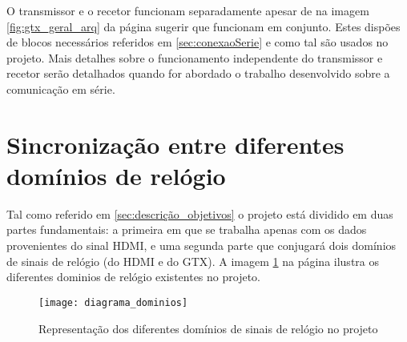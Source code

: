 O transmissor e o recetor funcionam separadamente apesar de na imagem \ref{fig:gtx_geral_arq} da página \pageref{fig:gtx_geral_arq} sugerir que funcionam em conjunto. Estes dispões de blocos necessários referidos em \ref{sec:conexaoSerie} e como tal são usados no projeto. Mais detalhes sobre o funcionamento independente do transmissor e recetor serão detalhados quando for abordado o trabalho desenvolvido sobre a comunicação em série.




\section{Sincronização entre diferentes domínios de relógio}

Tal como referido em \ref{sec:descrição_objetivos} o projeto está dividido em duas partes fundamentais: a primeira em que se trabalha apenas com os dados provenientes do sinal HDMI, e uma segunda parte que conjugará dois domínios de sinais de relógio (do HDMI e do GTX). A imagem \ref{fig:dominios_diferentes} na página \pageref{fig:dominios_diferentes} ilustra os diferentes dominios de relógio existentes no projeto.

\begin{figure}[h!]
	\begin{center}
		\leavevmode
		\texttt{[image: diagrama\_dominios]}
		\caption{Representação dos diferentes domínios de sinais de relógio no projeto}
		\label{fig:dominios_diferentes}
	\end{center}
\end{figure}

